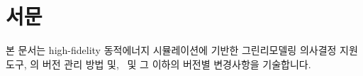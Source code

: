 \documentclass[oneside,openany,a4paper,12pt]{book}
\begin{document}
\pagestyle{plain} 


\newcommand{\newversionsection}[6]{
  \newpage
  \phantomsection
  \section*{Version #1 (#2)}
  \addcontentsline{toc}{section}{Version #1 (#2)}

  \begin{itemize}
    \item \textbf{추가된 기능}
    #3
    
    \item \textbf{변경된 기능}
    #4

    \item \textbf{수정된 기능}
    #5
    
    \item \textbf{제거된 기능}
    #6
\end{itemize}

}



\section*{서문}
본 문서는 high-fidelity 동적에너지 시뮬레이션에 기반한 그린리모델링 의사결정 지원 도구, \simulator 의 버전 관리 방법 및, \releaseversion~및 그 이하의 버전별 변경사항을 기술합니다.


\tableofcontents       
\listoffigures          
\listoftables          


\clearpage      
{}

\mainmatter





\backmatter



\end{document}
